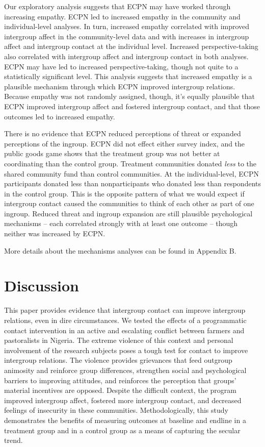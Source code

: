 \documentclass[11pt]{article}
\begin{document}
Our exploratory analysis suggests that ECPN may have worked through
increasing empathy. ECPN led to increased empathy in the community and
individual-level analyses. In turn, increased empathy correlated with
improved intergroup affect in the community-level data and with
increases in intergroup affect and intergroup contact at the individual
level. Increased perspective-taking also correlated with intergroup
affect and intergroup contact in both analyses. ECPN may have led to
increased perspective-taking, though not quite to a statistically
significant level. This analysis suggests that increased empathy is a
plausible mechanism through which ECPN improved intergroup relations.
Because empathy was not randomly assigned, though, it's equally
plausible that ECPN improved intergroup affect and fostered intergroup
contact, and that those outcomes led to increased empathy.

There is no evidence that ECPN reduced perceptions of threat or expanded
perceptions of the ingroup. ECPN did not effect either survey index, and
the public goods game shows that the treatment group was not better at
coordinating than the control group. Treatment communities donated
\emph{less} to the shared community fund than control communities. At
the individual-level, ECPN participants donated less than
nonparticipants who donated less than respondents in the control group.
This is the opposite pattern of what we would expect if intergroup
contact caused the communities to think of each other as part of one
ingroup. Reduced threat and ingroup expansion are still plausible
psychological mechanisms -- each correlated strongly with at least one
outcome -- though neither was increased by ECPN.

More details about the mechanisms analyses can be found in Appendix B.

\hypertarget{discussion}{%
\section{Discussion}\label{discussion}}

This paper provides evidence that intergroup contact can improve
intergroup relations, even in dire circumstances. We tested the effects
of a programmatic contact intervention in an active and escalating
conflict between farmers and pastoralists in Nigeria. The extreme
violence of this context and personal involvement of the research
subjects poses a tough test for contact to improve intergroup relations.
The violence provides grievances that feed outgroup animosity and
reinforce group differences, strengthen social and psychological
barriers to improving attitudes, and reinforces the perception that
groups' material incentives are opposed. Despite the difficult context,
the program improved intergroup affect, fostered more intergroup
contact, and decreased feelings of insecurity in these communities.
Methodologically, this study demonstrates the benefits of measuring
outcomes at baseline and endline in a treatment group and in a control
group as a means of capturing the secular trend.
\end{document}
